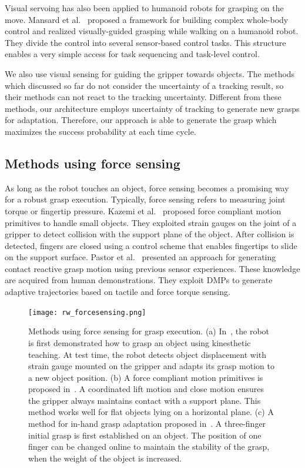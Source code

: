 Visual servoing has also been applied to humanoid robots for grasping on the move. Mansard et al.~\cite{Mansard2007} proposed a framework for building complex whole-body control and realized visually-guided grasping while walking on a humanoid robot. They divide the control into several sensor-based control tasks. This structure enables a very simple access for task sequencing and task-level control.

We also use visual sensing for guiding the gripper towards objects. The methods which discussed so far do not consider the uncertainty of a tracking result, so their methods can not react to the tracking uncertainty. Different from these methods, our architecture employs uncertainty of tracking to generate new grasps for adaptation. Therefore, our approach is able to generate the grasp which maximizes the success probability at each time cycle.    

\subsection{Methods using force sensing} 
As long as the robot touches an object, force sensing becomes a promising way for a robust grasp execution. Typically, force sensing refers to measuring joint torque or fingertip pressure. Kazemi et al.~\cite{Kazemi2012} proposed force compliant motion primitives to handle small objects. They exploited strain gauges on the joint of a gripper to detect collision with the support plane of the object. After collision is detected, fingers are closed using a control scheme that enables fingertips to slide on the support surface. Pastor et al.~\cite{Pastor2011} presented an approach for generating contact reactive grasp motion using previous sensor experiences. These knowledge are acquired from human demonstrations. They exploit DMPs \cite{Ijspeert2013} to generate adaptive trajectories based on tactile and force torque sensing.  

\begin{figure}[!htbp]
\centering
\texttt{[image: rw\_forcesensing.png]}
\captionsetup{justification=raggedright}
\caption{Methods using force sensing for grasp execution. (a) In~\cite{Pastor2011}, the robot is first demonstrated how to grasp an object using kinesthetic teaching. At test time, the robot detects object displacement with strain gauge mounted on the gripper and adapts its grasp motion to a new object position. (b) A force compliant motion primitives is proposed in~\cite{Kazemi2012}. A coordinated lift motion and close motion ensures the gripper always maintains contact with a support plane. This method works well for flat objects lying on a horizontal plane. (c) A method for in-hand grasp adaptation proposed in~\cite{Li2014}. A three-finger initial grasp is first established on an object. The position of one finger can be changed online to maintain the stability of the grasp, when the weight of the object is increased. }
\label{fig:rw_forcesensing}       
\end{figure}

